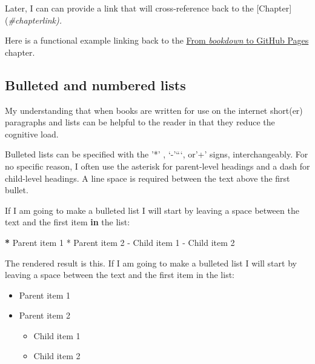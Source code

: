 \documentclass[
]{book}
\newenvironment{Shaded}{\begin{snugshade}}{\end{snugshade}}
\newcommand{\CommentTok}[1]{\textcolor[rgb]{0.56,0.35,0.01}{\textit{#1}}}
\newcommand{\ControlFlowTok}[1]{\textcolor[rgb]{0.13,0.29,0.53}{\textbf{#1}}}
\newcommand{\DecValTok}[1]{\textcolor[rgb]{0.00,0.00,0.81}{#1}}
\newcommand{\ErrorTok}[1]{\textcolor[rgb]{0.64,0.00,0.00}{\textbf{#1}}}
\newcommand{\NormalTok}[1]{#1}
\newcommand{\SpecialCharTok}[1]{\textcolor[rgb]{0.00,0.00,0.00}{#1}}
\providecommand{\tightlist}{%
  \setlength{\itemsep}{0pt}\setlength{\parskip}{0pt}}
\begin{document}
\begin{Shaded}
\begin{Highlighting}[]
\NormalTok{Later, I can can provide a link that will cross}\SpecialCharTok{{-}}\NormalTok{reference back to the [Chapter](}\CommentTok{\#chapterlink).}
\end{Highlighting}
\end{Shaded}

Here is a functional example linking back to the \protect\hyperlink{book1}{From \emph{bookdown} to GitHub Pages} chapter.

\hypertarget{bulleted-and-numbered-lists}{%
\subsection{Bulleted and numbered lists}\label{bulleted-and-numbered-lists}}

My understanding that when books are written for use on the internet short(er) paragraphs and lists can be helpful to the reader in that they reduce the cognitive load.

Bulleted lists can be specified with the '*' , `-'```, or'+' signs, interchangeably. For no specific reason, I often use the asterisk for parent-level headings and a dash for child-level headings. A line space is required between the text above the first bullet.

\begin{Shaded}
\begin{Highlighting}[]
\NormalTok{If I am going to make a bulleted list I will start by leaving a space between the text and the first item }\ControlFlowTok{in}\NormalTok{ the list}\SpecialCharTok{:}
  
\ErrorTok{*}\NormalTok{ Parent item }\DecValTok{1}
\SpecialCharTok{*}\NormalTok{ Parent item }\DecValTok{2}
  \SpecialCharTok{{-}}\NormalTok{ Child item }\DecValTok{1}
  \SpecialCharTok{{-}}\NormalTok{ Child item }\DecValTok{2}
\end{Highlighting}
\end{Shaded}

The rendered result is this. If I am going to make a bulleted list I will start by leaving a space between the text and the first item in the list:

\begin{itemize}
\tightlist
\item
  Parent item 1
\item
  Parent item 2

  \begin{itemize}
  \tightlist
  \item
    Child item 1
  \item
    Child item 2
  \end{itemize}
\end{itemize}
\end{document}
